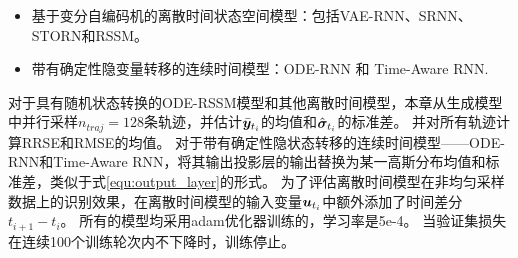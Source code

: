 \begin{itemize}
    \item 基于变分自编码机的离散时间状态空间模型：包括VAE-RNN、SRNN、STORN和RSSM。
    \item 带有确定性隐变量转移的连续时间模型：ODE-RNN 和 Time-Aware RNN.
\end{itemize}

对于具有随机状态转换的ODE-RSSM模型和其他离散时间模型，本章从生成模型中并行采样$n_{traj}=128$条轨迹，并估计$\bar{\boldsymbol{y}}_{t_i}$的均值和$\hat{\boldsymbol{\sigma}}_{t_i}$的标准差。
并对所有轨迹计算RRSE和RMSE的均值。
对于带有确定性隐状态转移的连续时间模型——ODE-RNN和Time-Aware RNN，将其输出投影层的输出替换为某一高斯分布均值和标准差，类似于式\eqref{equ:output_layer}的形式。
为了评估离散时间模型在非均匀采样数据上的识别效果，在离散时间模型的输入变量$\boldsymbol{u}_{t_i}$中额外添加了时间差分 $t_{i+1}-t_i$。
所有的模型均采用adam优化器训练的，学习率是5e-4。
当验证集损失在连续100个训练轮次内不下降时，训练停止。


